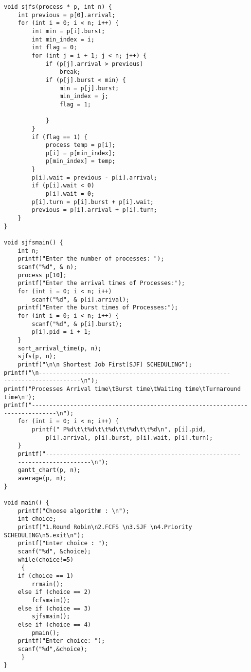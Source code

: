 \documentclass{article}
\begin{document}
\begin{Verbatim}[tabsize = 4]
void sjfs(process * p, int n) {
    int previous = p[0].arrival;
    for (int i = 0; i < n; i++) {
        int min = p[i].burst;
        int min_index = i;
        int flag = 0;
        for (int j = i + 1; j < n; j++) {
            if (p[j].arrival > previous)
                break;
            if (p[j].burst < min) {
                min = p[j].burst;
                min_index = j;
                flag = 1;

            }
        }
        if (flag == 1) {
            process temp = p[i];
            p[i] = p[min_index];
            p[min_index] = temp;
        }
        p[i].wait = previous - p[i].arrival;
        if (p[i].wait < 0)
            p[i].wait = 0;
        p[i].turn = p[i].burst + p[i].wait;
        previous = p[i].arrival + p[i].turn;
    }
}

void sjfsmain() {
    int n;
    printf("Enter the number of processes: ");
    scanf("%d", & n);
    process p[10];
    printf("Enter the arrival times of Processes:");
    for (int i = 0; i < n; i++)
        scanf("%d", & p[i].arrival);
    printf("Enter the burst times of Processes:");
    for (int i = 0; i < n; i++) {
        scanf("%d", & p[i].burst);
        p[i].pid = i + 1;
    }
    sort_arrival_time(p, n);
    sjfs(p, n);
    printf("\n\n Shortest Job First(SJF) SCHEDULING");
printf("\n-------------------------------------------------------
----------------------\n");
printf("Processes Arrival time\tBurst time\tWaiting time\tTurnaround time\n");
printf("--------------------------------------------------------------
---------------\n");
    for (int i = 0; i < n; i++) {
        printf(" P%d\t\t%d\t\t%d\t\t%d\t\t%d\n", p[i].pid,
            p[i].arrival, p[i].burst, p[i].wait, p[i].turn);
    }
    printf("--------------------------------------------------------
    ---------------------\n");
    gantt_chart(p, n);
    average(p, n);
}

void main() {
    printf("Choose algorithm : \n");
    int choice;
    printf("1.Round Robin\n2.FCFS \n3.SJF \n4.Priority SCHEDULING\n5.exit\n");
    printf("Enter choice : ");
    scanf("%d", &choice);
    while(choice!=5)
     {
    if (choice == 1)
        rrmain();
    else if (choice == 2)
        fcfsmain();
    else if (choice == 3)
        sjfsmain();
    else if (choice == 4)
        pmain();
    printf("Enter choice: ");
    scanf("%d",&choice);
     }
}
\end{Verbatim}
\end{document}
